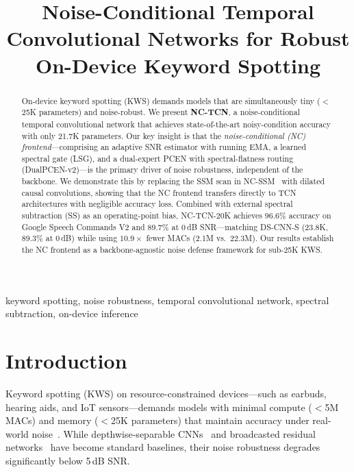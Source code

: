 \documentclass[conference]{IEEEtran}
\begin{document}
\title{Noise-Conditional Temporal Convolutional Networks for Robust On-Device Keyword Spotting}

\author{
}

\maketitle

\begin{abstract}
On-device keyword spotting (KWS) demands models that are simultaneously tiny ($<$25K parameters) and noise-robust.
We present \textbf{NC-TCN}, a noise-conditional temporal convolutional network that achieves state-of-the-art noisy-condition accuracy with only 21.7K parameters.
Our key insight is that the \emph{noise-conditional (NC) frontend}---comprising an adaptive SNR estimator with running EMA, a learned spectral gate (LSG), and a dual-expert PCEN with spectral-flatness routing (DualPCEN-v2)---is the primary driver of noise robustness, independent of the backbone.
We demonstrate this by replacing the SSM scan in NC-SSM~\cite{choi2026ncssm} with dilated causal convolutions, showing that the NC frontend transfers directly to TCN architectures with negligible accuracy loss.
Combined with external spectral subtraction (SS) as an operating-point bias, NC-TCN-20K achieves 96.6\% accuracy on Google Speech Commands V2 and 89.7\% at 0\,dB SNR---matching DS-CNN-S (23.8K, 89.3\% at 0\,dB) while using $10.9\times$ fewer MACs (2.1M vs.\ 22.3M).
Our results establish the NC frontend as a backbone-agnostic noise defense framework for sub-25K KWS.
\end{abstract}

\begin{IEEEkeywords}
keyword spotting, noise robustness, temporal convolutional network, spectral subtraction, on-device inference
\end{IEEEkeywords}

\section{Introduction}
\label{sec:intro}

Keyword spotting (KWS) on resource-constrained devices---such as earbuds, hearing aids, and IoT sensors---demands models with minimal compute ($<$5M MACs) and memory ($<$25K parameters) that maintain accuracy under real-world noise~\cite{zhang2017hello, choi2019temporal}.
While depthwise-separable CNNs~\cite{zhang2017hello} and broadcasted residual networks~\cite{kim2021broadcasted} have become standard baselines, their noise robustness degrades significantly below 5\,dB SNR.
\end{document}
